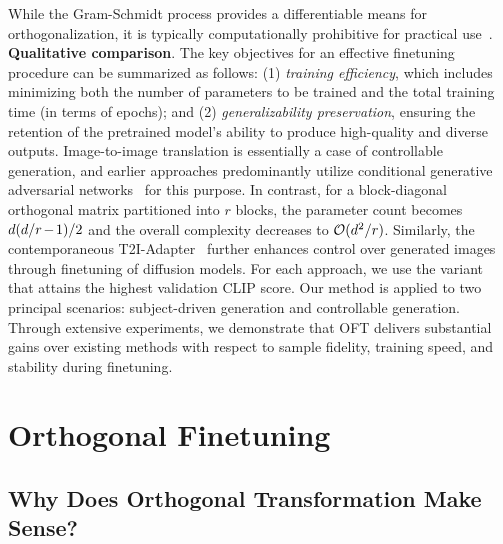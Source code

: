 {While the Gram-Schmidt process provides a differentiable means for orthogonalization, it is typically computationally prohibitive for practical use~\cite{liu2021orthogonal}. \textbf{Qualitative comparison}. The key objectives for an effective finetuning procedure can be summarized as follows: (1) \emph{training efficiency}, which includes minimizing both the number of parameters to be trained and the total training time (in terms of epochs); and (2) \emph{generalizability preservation}, ensuring the retention of the pretrained model's ability to produce high-quality and diverse outputs. Image-to-image translation is essentially a case of controllable generation, and earlier approaches predominantly utilize conditional generative adversarial networks~\cite{isola2017image,zhu2017toward,wang2018high,park2019semantic,choi2018stargan} for this purpose. In contrast, for a block-diagonal orthogonal matrix partitioned into $r$ blocks, the parameter count becomes $\thickmuskip=2mu \medmuskip=2mu d(d/r-1)/2$ and the overall complexity decreases to $\thickmuskip=2mu \medmuskip=2mu \mathcal{O}(d^2/r)$. Similarly, the contemporaneous T2I-Adapter~\cite{mou2023t2i} further enhances control over generated images through finetuning of diffusion models. For each approach, we use the variant that attains the highest validation CLIP score. Our method is applied to two principal scenarios: subject-driven generation and controllable generation. Through extensive experiments, we demonstrate that OFT delivers substantial gains over existing methods with respect to sample fidelity, training speed, and stability during finetuning. \section{Orthogonal Finetuning}

\subsection{Why Does Orthogonal Transformation Make Sense?}

}
